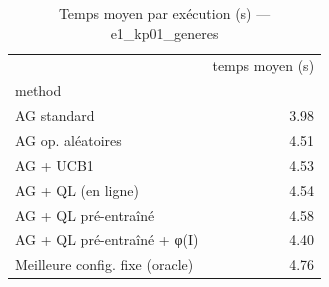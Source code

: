 \begin{table}
\caption{Temps moyen par exécution (s) — e1_kp01_generes}
\label{tab:temps}
\begin{tabular}{lr}
\toprule
 & temps moyen (s) \\
method &  \\
\midrule
AG standard & 3.98 \\
AG op. aléatoires & 4.51 \\
AG + UCB1 & 4.53 \\
AG + QL (en ligne) & 4.54 \\
AG + QL pré-entraîné & 4.58 \\
AG + QL pré-entraîné + φ(I) & 4.40 \\
Meilleure config. fixe (oracle) & 4.76 \\
\bottomrule
\end{tabular}
\end{table}
